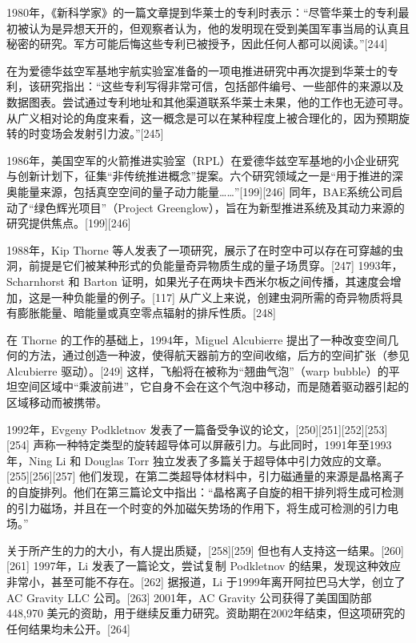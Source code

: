 1980年，《新科学家》的一篇文章提到华莱士的专利时表示：“尽管华莱士的专利最初被认为是异想天开的，但观察者认为，他的发明现在受到美国军事当局的认真且秘密的研究。军方可能后悔这些专利已被授予，因此任何人都可以阅读。”[244]  

在为爱德华兹空军基地宇航实验室准备的一项电推进研究中再次提到华莱士的专利，该研究指出：“这些专利写得非常可信，包括部件编号、一些部件的来源以及数据图表。尝试通过专利地址和其他渠道联系华莱士未果，他的工作也无迹可寻。从广义相对论的角度来看，这一概念是可以在某种程度上被合理化的，因为预期旋转的时变场会发射引力波。”[245]  

1986年，美国空军的火箭推进实验室（RPL）在爱德华兹空军基地的小企业研究与创新计划下，征集“非传统推进概念”提案。六个研究领域之一是“用于推进的深奥能量来源，包括真空空间的量子动力能量……”[199][246] 同年，BAE系统公司启动了“绿色辉光项目”（Project Greenglow），旨在为新型推进系统及其动力来源的研究提供焦点。[199][246]  

1988年，Kip Thorne 等人发表了一项研究，展示了在时空中可以存在可穿越的虫洞，前提是它们被某种形式的负能量奇异物质生成的量子场贯穿。[247] 1993年，Scharnhorst 和 Barton 证明，如果光子在两块卡西米尔板之间传播，其速度会增加，这是一种负能量的例子。[117] 从广义上来说，创建虫洞所需的奇异物质将具有膨胀能量、暗能量或真空零点辐射的排斥性质。[248]  

在 Thorne 的工作的基础上，1994年，Miguel Alcubierre 提出了一种改变空间几何的方法，通过创造一种波，使得航天器前方的空间收缩，后方的空间扩张（参见 Alcubierre 驱动）。[249] 这样，飞船将在被称为“翘曲气泡”（warp bubble）的平坦空间区域中“乘波前进”，它自身不会在这个气泡中移动，而是随着驱动器引起的区域移动而被携带。  

1992年，Evgeny Podkletnov 发表了一篇备受争议的论文，[250][251][252][253][254] 声称一种特定类型的旋转超导体可以屏蔽引力。与此同时，1991年至1993年，Ning Li 和 Douglas Torr 独立发表了多篇关于超导体中引力效应的文章。[255][256][257] 他们发现，在第二类超导体材料中，引力磁通量的来源是晶格离子的自旋排列。他们在第三篇论文中指出：“晶格离子自旋的相干排列将生成可检测的引力磁场，并且在一个时变的外加磁矢势场的作用下，将生成可检测的引力电场。”  

关于所产生的力的大小，有人提出质疑，[258][259] 但也有人支持这一结果。[260][261] 1997年，Li 发表了一篇论文，尝试复制 Podkletnov 的结果，发现这种效应非常小，甚至可能不存在。[262] 据报道，Li 于1999年离开阿拉巴马大学，创立了 AC Gravity LLC 公司。[263] 2001年，AC Gravity 公司获得了美国国防部 448,970 美元的资助，用于继续反重力研究。资助期在2002年结束，但这项研究的任何结果均未公开。[264]  

